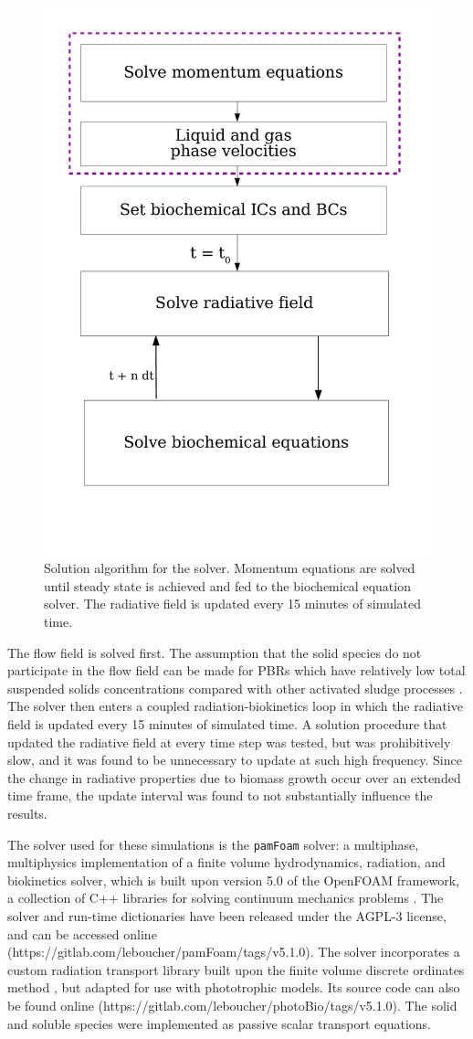 \begin{figure}[tp]
\centering
\includegraphics[width=0.6\linewidth]{Images/Chap3/algo_devt.pdf}
\caption{Solution algorithm for the solver. Momentum equations are solved until steady state is achieved and fed to the biochemical equation solver. The radiative field is updated every 15 minutes of simulated time.}
\label{fig:solnHierarchy}
\end{figure}

The flow field is solved first. The assumption that the solid species do not participate in the flow field can be made for PBRs which have relatively low total suspended solids concentrations compared with other activated sludge processes \cite{Bitog2011}. The solver then enters a coupled radiation-biokinetics loop in which the radiative field is updated every 15 minutes of simulated time. A solution procedure that updated the radiative field at every time step was tested, but was prohibitively slow, and it was found to be unnecessary to update at such high frequency. Since the change in radiative properties due to biomass growth occur over an extended time frame, the update interval was found to not substantially influence the results.
\skippingparagraph

The solver used for these simulations is the \texttt{pamFoam} solver: a multiphase, multiphysics implementation of a finite volume hydrodynamics, radiation, and biokinetics solver, which is built upon version 5.0 of the OpenFOAM framework, a collection of C++ libraries for solving continuum mechanics problems \cite{of50}. The solver and run-time dictionaries have been released under the AGPL-3 license, and can be accessed online (https://gitlab.com/leboucher/pamFoam/tags/v5.1.0). The solver incorporates a custom radiation transport library built upon the finite volume discrete ordinates method \cite{Raithby1990}, but adapted for use with phototrophic models. Its source code can also be found online (https://gitlab.com/leboucher/photoBio/tags/v5.1.0). The solid and soluble species were implemented as passive scalar transport equations.


